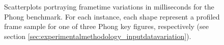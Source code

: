 
\begin{figure}
	\centering
	

    \caption[Phong benchmark frametime variations]{Scatterplots portraying frametime variations in milliseconds for the Phong benchmark. For each instance, each shape represent a profiled frame sample for one of three Phong key figures, respectively (see section \ref{sec:experimentalmethodology_inputdatavariation}).}
    \label{fig:scattersphong}
\end{figure}